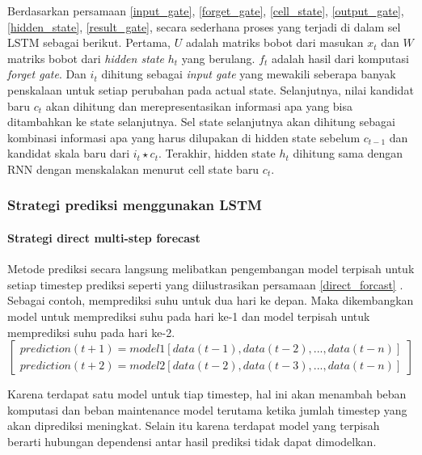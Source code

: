 \documentclass[../thesis.tex]{subfiles}
\begin{document}
Berdasarkan persamaan \ref{input_gate}, \ref{forget_gate}, \ref{cell_state}, \ref{output_gate}, \ref{hidden_state}, \ref{result_gate}, secara sederhana proses yang terjadi di dalam sel LSTM sebagai berikut. Pertama, $U$ adalah matriks bobot dari masukan $x_{t}$ dan $W$ matriks bobot dari \textit{hidden state} $h_{t}$ yang berulang. 
$f_{t}$ adalah hasil dari komputasi \textit{forget gate}. Dan $i_{t}$ dihitung sebagai \textit{input gate} yang mewakili seberapa banyak penskalaan untuk setiap perubahan pada actual state. 
Selanjutnya, nilai kandidat baru $c_t$ akan dihitung dan merepresentasikan informasi apa yang bisa ditambahkan ke state selanjutnya. 
Sel state selanjutnya akan dihitung sebagai kombinasi informasi apa yang harus dilupakan di hidden state sebelum $c_{t-1}$ dan kandidat skala baru dari $i_{t} \star c_{t}$. 
Terakhir, hidden state $h_{t}$ dihitung sama dengan RNN dengan menskalakan menurut cell state baru $c_t$.

\subsubsection{Strategi prediksi menggunakan LSTM}
\paragraph{Strategi direct multi-step forecast}

Metode prediksi secara langsung melibatkan pengembangan model terpisah untuk setiap timestep prediksi seperti yang diilustrasikan persamaan \ref{direct_forcast} \cite{Forecast_Strategy}.
Sebagai contoh, memprediksi suhu untuk dua hari ke depan. Maka dikembangkan model untuk memprediksi suhu pada hari ke-1 dan model terpisah untuk memprediksi suhu pada hari ke-2.
\begin{equation} \label{direct_forcast}
\begin{bmatrix}
	prediction(t+1) = model1[data(t-1), data(t-2), ..., data(t-n)]
	\\prediction(t+2) = model2[data(t-2), data(t-3), ..., data(t-n)]
\end{bmatrix}
\end{equation}

Karena terdapat satu model untuk tiap timestep, hal ini akan menambah beban komputasi dan beban maintenance model terutama ketika jumlah timestep yang akan diprediksi meningkat. Selain itu
karena terdapat model yang terpisah berarti hubungan dependensi antar hasil prediksi tidak dapat dimodelkan.
\end{document}
